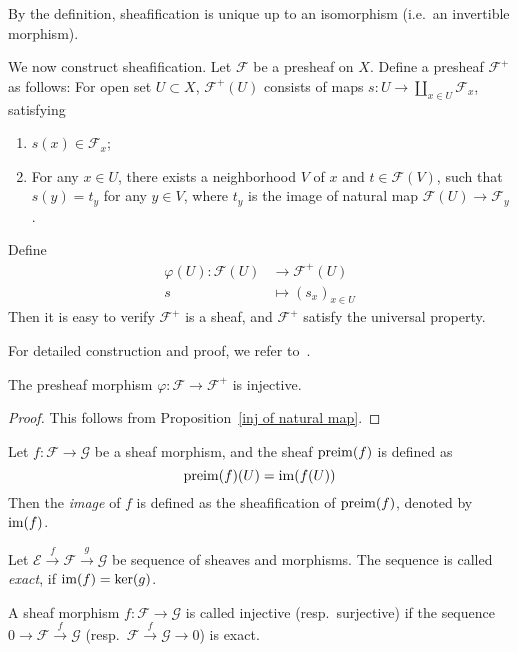 By the definition, sheafification is unique up to an isomorphism (i.e.\ an invertible morphism).
\begin{cons}
    We now construct sheafification.
    Let $\mathcal{F}$ be a presheaf on $X$.
    Define a presheaf $\mathcal{F}^+$ as follows:
    For open set $U\subset X$, $\mathcal{F}^+(U)$ consists of maps $s:U\to\coprod_{x\in U}\mathcal{F}_x$,
    satisfying
    \begin{enumerate}[(1)]
        \item $s(x)\in\mathcal{F}_x$;
        \item For any $x\in U$, there exists a neighborhood $V$ of $x$ and $t\in\mathcal{F}(V)$, such that $s(y)=t_y$ for any $y\in V$, where $t_y$ is the image of natural map $\mathcal{F}(U)\to\mathcal{F}_y$. 
    \end{enumerate}
    Define
    \begin{align*}
        \varphi(U):\mathcal{F}(U)&\to\mathcal{F}^+(U)\\
        s&\mapsto(s_x)_{x\in U}
    \end{align*}
    Then it is easy to verify $\mathcal{F}^+$ is a sheaf, and $\mathcal{F}^+$ satisfy the universal property.
\end{cons}
For detailed construction and proof, we refer to~\cite[Section 6.17]{stacks-project}.

\begin{lem}\label{inj of sheafification map}
    The presheaf morphism $\varphi:\mathcal{F}\to\mathcal{F}^+$ is injective.
\end{lem}
\begin{proof}
    This follows from Proposition~\ref{inj of natural map}.
\end{proof}

\begin{defn}
    Let $f:\mathcal{F}\to\mathcal{G}$ be a sheaf morphism, and the sheaf $\operatorname{preim}(f)$ is defined as
    \[\operatorname{preim}(f)(U)=\operatorname{im}(f(U))\]
    Then the \emph{image} of $f$ is defined as the sheafification of $\operatorname{preim}(f)$, denoted by $\operatorname{im}(f)$.
\end{defn}

\begin{defn}
    Let $\mathcal{E}\xrightarrow{f}\mathcal{F}\xrightarrow{g}\mathcal{G}$ be sequence of sheaves and morphisms.
    The sequence is called \emph{exact}, if $\operatorname{im}(f)=\ker(g)$.
    
    A sheaf morphism $f:\mathcal{F}\to\mathcal{G}$ is called injective (resp.\ surjective) if the sequence $0\to\mathcal{F}\xrightarrow{f}\mathcal{G}$ (resp.\ $\mathcal{F}\xrightarrow{f}\mathcal{G}\to 0$) is exact.
\end{defn}

